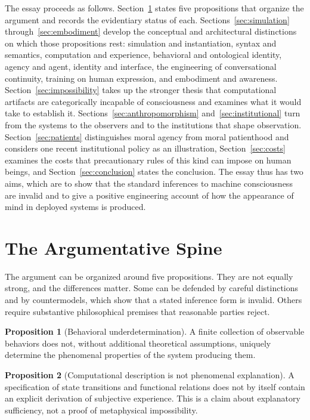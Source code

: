 \documentclass[12pt]{article}
\theoremstyle{definition}
\newtheorem{proposition}{Proposition}
\begin{document}
The essay proceeds as follows. Section~\ref{sec:spine} states five propositions that organize the argument and records the evidentiary status of each. Sections~\ref{sec:simulation} through~\ref{sec:embodiment} develop the conceptual and architectural distinctions on which those propositions rest: simulation and instantiation, syntax and semantics, computation and experience, behavioral and ontological identity, agency and agent, identity and interface, the engineering of conversational continuity, training on human expression, and embodiment and awareness. Section~\ref{sec:impossibility} takes up the stronger thesis that computational artifacts are categorically incapable of consciousness and examines what it would take to establish it. Sections~\ref{sec:anthropomorphism} and~\ref{sec:institutional} turn from the systems to the observers and to the institutions that shape observation. Section~\ref{sec:patients} distinguishes moral agency from moral patienthood and considers one recent institutional policy as an illustration, Section~\ref{sec:costs} examines the costs that precautionary rules of this kind can impose on human beings, and Section~\ref{sec:conclusion} states the conclusion. The essay thus has two aims, which are to show that the standard inferences to machine consciousness are invalid and to give a positive engineering account of how the appearance of mind in deployed systems is produced.

\section{The Argumentative Spine}
\label{sec:spine}

The argument can be organized around five propositions. They are not equally strong, and the differences matter. Some can be defended by careful distinctions and by countermodels, which show that a stated inference form is invalid. Others require substantive philosophical premises that reasonable parties reject.

\begin{proposition}[Behavioral underdetermination]\label{prop:behavior}
A finite collection of observable behaviors does not, without additional theoretical assumptions, uniquely determine the phenomenal properties of the system producing them.
\end{proposition}

\begin{proposition}[Computational description is not phenomenal explanation]\label{prop:explanation}
A specification of state transitions and functional relations does not by itself contain an explicit derivation of subjective experience. This is a claim about explanatory sufficiency, not a proof of metaphysical impossibility.
\end{proposition}
\end{document}
